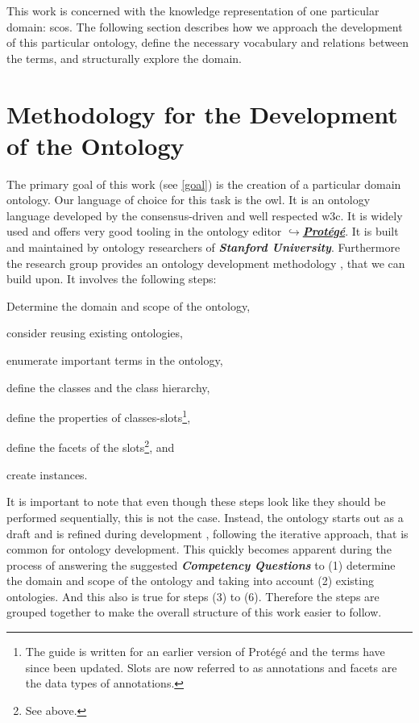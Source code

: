 \documentclass[a4paper, DIV=13, BCOR=0cm]{scrbook}
\newcommand{\pn}[1]{\textit{\textbf{#1}}}
\newcommand{\link}[2]{\href{#1}{$\hookrightarrow$#2}}
\begin{document}
This work is concerned with the knowledge representation of one particular domain: \glspl{sco}. The following section describes how we approach the development of this particular ontology, define the necessary vocabulary and relations between the terms, and structurally explore the domain.

\section{Methodology for the Development of the Ontology }
\label{methodology}
The primary goal of this work (see \autoref{goal}) is the creation of a particular domain ontology. Our language of choice for this task is the \gls{owl}. It is an ontology language developed by the consensus-driven and well respected \gls{w3c}. \cite[p.\,206]{baader2017introduction} It is widely used and offers very good tooling in the ontology editor \link{https://protege.stanford.edu}{\pn{Protégé}}. It is built and maintained by ontology researchers of \pn{Stanford University}. \cite{musen2015protege} Furthermore the research group provides an ontology development methodology \cite{guide-to-ontology}, that we can build upon. It involves the following steps:
\begin{compactenum}[(1)]
	\item Determine the domain and scope of the ontology,
	\item consider reusing existing ontologies,
	\item enumerate important terms in the ontology,
	\item define the classes and the class hierarchy,
	\item define the properties of classes-slots\footnote{The guide is written for an earlier version of Protégé and the terms have since been updated. Slots are now referred to as annotations and facets are the data types of annotations.},
	\item define the facets of the slots\footnote{See above.}, and
	\item create instances.
\end{compactenum}

It is important to note that even though these steps look like they should be performed sequentially, this is not the case. Instead, the ontology starts out as a draft and is refined during development \cite[Section 3, Introduction]{guide-to-ontology}, following the iterative approach, that is common for ontology development. \cite[p.\,158, section 1.5.1]{stuckenschmidt2010ontologien} This quickly becomes apparent during the process of answering the suggested \pn{Competency Questions} to (1) determine the domain and scope of the ontology \cite[Section 3, Step 1]{guide-to-ontology} and taking into account (2) existing ontologies. And this also is true for steps (3) to (6). Therefore the steps are grouped together to make the overall structure of this work easier to follow.
\end{document}
